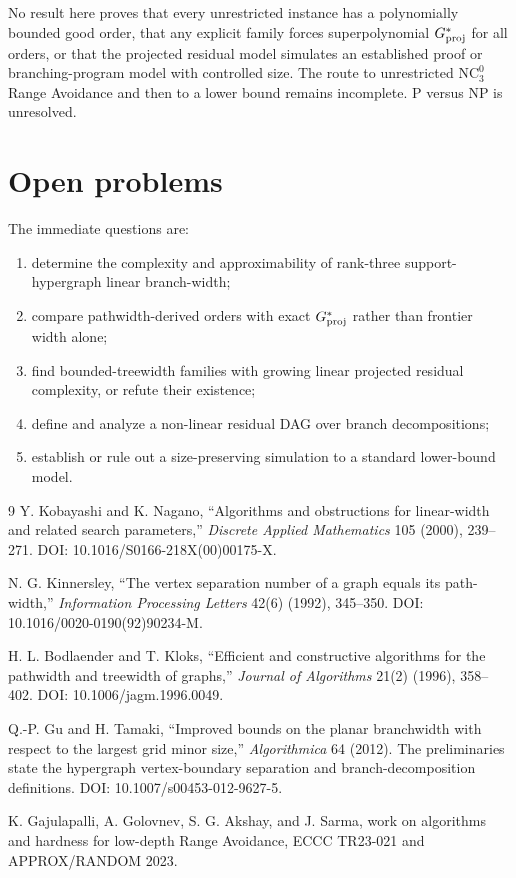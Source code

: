 \documentclass[11pt]{article}
\begin{document}
No result here proves that every unrestricted instance has a polynomially bounded good order, that any explicit family forces superpolynomial $G^*_{\rm proj}$ for all orders, or that the projected residual model simulates an established proof or branching-program model with controlled size.  The route to unrestricted $\mathrm{NC}^0_3$ Range Avoidance and then to a lower bound remains incomplete.  P versus NP is unresolved.

\section{Open problems}
The immediate questions are:
\begin{enumerate}
\item determine the complexity and approximability of rank-three support-hypergraph linear branch-width;
\item compare pathwidth-derived orders with exact $G^*_{\rm proj}$ rather than frontier width alone;
\item find bounded-treewidth families with growing linear projected residual complexity, or refute their existence;
\item define and analyze a non-linear residual DAG over branch decompositions;
\item establish or rule out a size-preserving simulation to a standard lower-bound model.
\end{enumerate}

\begin{thebibliography}{9}
Y. Kobayashi and K. Nagano,
``Algorithms and obstructions for linear-width and related search parameters,''
\emph{Discrete Applied Mathematics} 105 (2000), 239--271.
DOI: 10.1016/S0166-218X(00)00175-X.

N. G. Kinnersley,
``The vertex separation number of a graph equals its path-width,''
\emph{Information Processing Letters} 42(6) (1992), 345--350.
DOI: 10.1016/0020-0190(92)90234-M.

H. L. Bodlaender and T. Kloks,
``Efficient and constructive algorithms for the pathwidth and treewidth of graphs,''
\emph{Journal of Algorithms} 21(2) (1996), 358--402.
DOI: 10.1006/jagm.1996.0049.

Q.-P. Gu and H. Tamaki,
``Improved bounds on the planar branchwidth with respect to the largest grid minor size,''
\emph{Algorithmica} 64 (2012).
The preliminaries state the hypergraph vertex-boundary separation and branch-decomposition definitions.
DOI: 10.1007/s00453-012-9627-5.

K. Gajulapalli, A. Golovnev, S. G. Akshay, and J. Sarma,
work on algorithms and hardness for low-depth Range Avoidance,
ECCC TR23-021 and APPROX/RANDOM 2023.

\end{thebibliography}
\end{document}
